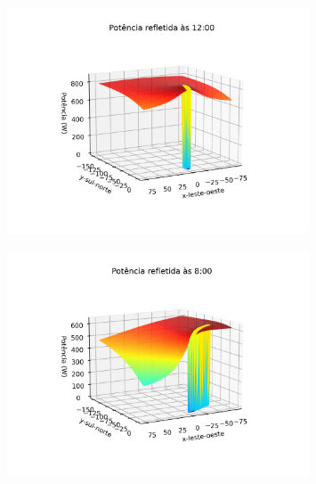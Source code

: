 \documentclass[12pt,notheorems,hyperref={pdfauthor=Professor Rafael Nardi}]{beamer}
\begin{document}
\begin{frame}%
	\begin{figure}[htpb]
		\centering
		\includegraphics[width=0.8\textwidth]{../../plots/tower_shadow_correction/square_grid_12am.png}
		\label{fig:heliost_field_at_12pm}
	\end{figure}
\end{frame}

\begin{frame}%
	\begin{figure}[htpb]
		\centering
		\includegraphics[width=0.8\textwidth]{../../plots/tower_shadow_correction/square_grid_8am.png}
		\label{fig:heliost_field_at_8am}
	\end{figure}
\end{frame}
\end{document}
